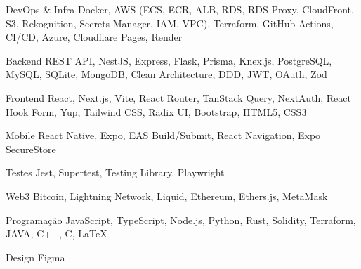 

\begin{cvskills}

  \cvskill
    {DevOps \& Infra} %
    {Docker, AWS (ECS, ECR, ALB, RDS, RDS Proxy, CloudFront, S3, Rekognition, Secrets Manager, IAM, VPC), Terraform, GitHub Actions, CI/CD, Azure, Cloudflare Pages, Render} %

  \cvskill
    {Backend} %
    {REST API, NestJS, Express, Flask, Prisma, Knex.js, PostgreSQL, MySQL, SQLite, MongoDB, Clean Architecture, DDD, JWT, OAuth, Zod} %

  \cvskill
    {Frontend} %
    {React, Next.js, Vite, React Router, TanStack Query, NextAuth, React Hook Form, Yup, Tailwind CSS, Radix UI, Bootstrap, HTML5, CSS3} %

  \cvskill
    {Mobile} %
    {React Native, Expo, EAS Build/Submit, React Navigation, Expo SecureStore} %

  \cvskill
    {Testes} %
    {Jest, Supertest, Testing Library, Playwright} %

  \cvskill
    {Web3} %
    {Bitcoin, Lightning Network, Liquid, Ethereum, Ethers.js, MetaMask} %

  \cvskill
    {Programação} %
    {JavaScript, TypeScript, Node.js, Python, Rust, Solidity, Terraform, JAVA, C++, C, LaTeX} %

  \cvskill
    {Design} %
    {Figma} %

\end{cvskills}
